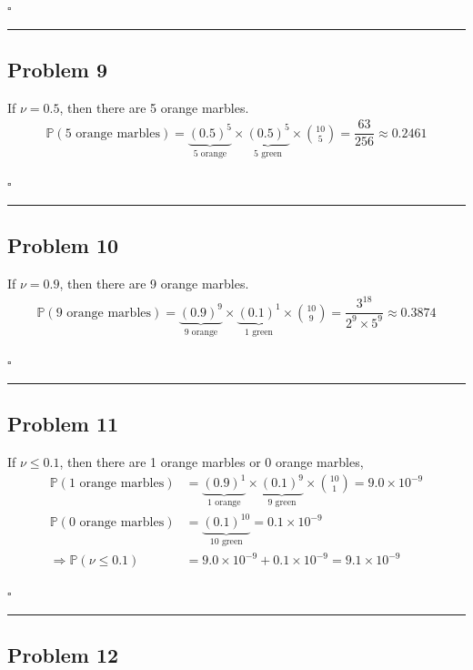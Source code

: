 \documentclass[12pt]{article}
\newcommand*{\QEDB}{\hfill\ensuremath{\square}}
\newcommand{\ParTh}[1]{\left(#1\right)}
\newcommand{\SciNum}[2]{#1\times{10}^{#2}}
\newcommand{\horrule}[1]{\rule{\linewidth}{#1}}
\begin{document}
\QEDB

\horrule{0.5pt}

\subsection*{Problem 9}

If $\nu = 0.5$, then there are 5 orange marbles.
\begin{align}
\mathbb{P}\ParTh{\text{5 orange marbles}}=\underbrace{\ParTh{0.5}^5}_{\text{5 orange}}\times\underbrace{\ParTh{0.5}^5}_{\text{5 green}}\times\binom{10}{5}=\dfrac{63}{256}\approx0.2461
\end{align}

\QEDB

\horrule{0.5pt}

\subsection*{Problem 10}

If $\nu = 0.9$, then there are 9 orange marbles.
\begin{align}
\mathbb{P}\ParTh{\text{9 orange marbles}}=\underbrace{\ParTh{0.9}^9}_{\text{9 orange}}\times\underbrace{\ParTh{0.1}^1}_{\text{1 green}}\times\binom{10}{9}=\dfrac{3^{18}}{2^9\times5^9}\approx0.3874
\end{align}

\QEDB

\horrule{0.5pt}

\subsection*{Problem 11}

If $\nu \leq 0.1$, then there are 1 orange marbles or 0 orange marbles,
\begin{align}
\mathbb{P}\ParTh{\text{1 orange marbles}}&=\underbrace{\ParTh{0.9}^1}_{\text{1 orange}}\times\underbrace{\ParTh{0.1}^9}_{\text{9 green}}\times\binom{10}{1}=\SciNum{9.0}{-9}\\
\mathbb{P}\ParTh{\text{0 orange marbles}}&=\underbrace{\ParTh{0.1}^{10}}_{\text{10 green}}=\SciNum{0.1}{-9}\\
\Rightarrow\mathbb{P}\ParTh{\nu\leq0.1}&=\SciNum{9.0}{-9}+\SciNum{0.1}{-9}=\SciNum{9.1}{-9}
\end{align}

\QEDB

\horrule{0.5pt}

\subsection*{Problem 12}
\end{document}
